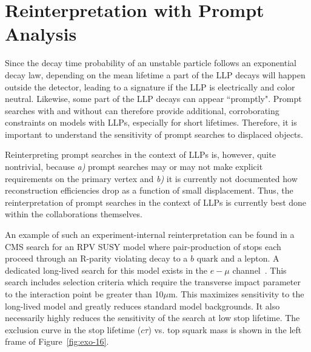 
\section{Reinterpretation with Prompt Analysis}\label{sec:ch5-recastingPrompt}



Since the decay time probability of an unstable particle follows an
exponential decay law, depending on the mean lifetime a part of the LLP 
decays will happen outside the detector, leading to a \MET signature if the LLP is
electrically and color neutral. Likewise, some part of the LLP decays
can appear ``promptly". Prompt searches with and without \MET can
therefore provide additional, corroborating constraints on models with
LLPs, especially for short lifetimes. Therefore, it is important to
understand the sensitivity of prompt searches to displaced objects.

Reinterpreting prompt searches in the context of LLPs is, however,
quite nontrivial, because {\it a)} prompt searches may or may not make
explicit requirements on the primary vertex and {\it b)} it is
currently not documented how reconstruction efficiencies drop as a
function of small displacement. Thus, the reinterpretation of prompt
searches in the context of LLPs is currently best done within the
collaborations themselves.


An example of such an experiment-internal reinterpretation can be found in a CMS
search for an RPV SUSY model where pair-production of stops each proceed through
an R-parity violating decay to a $b$ quark and a lepton. A dedicated long-lived
search for this model exists in the $e-\mu$ channel~\cite{CMS-PAS-EXO-16-022}.
This search includes selection criteria which require the transverse impact
parameter to the interaction point be greater than 10$\mu$m. This maximizes
sensitivity to the long-lived model and greatly reduces standard model
backgrounds. It also necessarily highly reduces the sensitivity of the search at
low stop lifetime. The exclusion curve in the stop lifetime ($c\tau$) vs. top
squark mass is shown in the left frame of Figure~\ref{fig:exo-16}.

